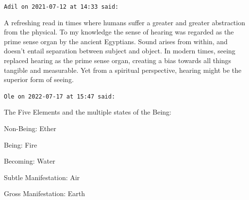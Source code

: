 \begin{footnotesize}
\begin{sffamily}
\texttt{Adil on 2021-07-12 at 14:33 said:}

A refreshing read in times where humans suffer a greater and greater abstraction from the physical. To my knowledge the sense of hearing was regarded as the prime sense organ by the ancient Egyptians. Sound arises from within, and doesn't entail separation between subject and object. In modern times, seeing replaced hearing as the prime sense organ, creating a bias towards all things tangible and measurable. Yet from a spiritual perspective, hearing might be the superior form of seeing.

\hfill

\texttt{Ole on 2022-07-17 at 15:47 said:}

The Five Elements and the multiple states of the Being:

Non-Being: Ether

Being: Fire

Becoming: Water

Subtle Manifestation: Air

Gross Manifestation: Earth


\hfill

\end{sffamily}
\end{footnotesize}

